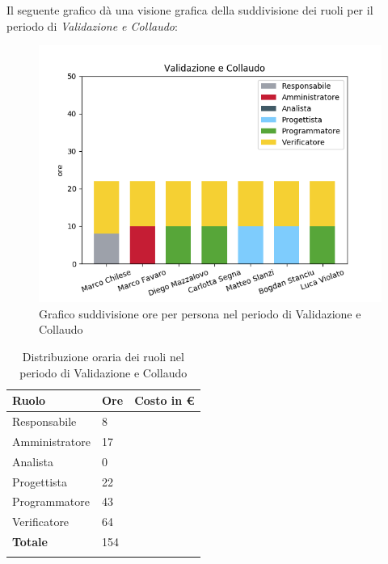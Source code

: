 Il seguente grafico dà una visione grafica della suddivisione dei ruoli per il periodo di \textit{Validazione e Collaudo}:

\begin{figure}[H]
	\centering
	\includegraphics[width=1\linewidth]{./images/fig_vc.png}
	\caption{Grafico suddivisione ore per persona nel periodo di Validazione e Collaudo}
	\label{fig:grafico suddivione ruoli periodo vc}
\end{figure}

\begin{longtable}{| C{.30\textwidth}| C{.15\textwidth}| C{.20\textwidth}|}
	\hline
	\textbf{Ruolo} & \textbf{Ore} & \textbf{Costo in \euro} \\
	\hline 
	Responsabile & 8 &  \\
	\hline
	Amministratore & 17 & \\
	\hline
	Analista & 0 &  \\
	\hline
	Progettista & 22 &  \\
	\hline
	Programmatore & 43 &  \\
	\hline
	Verificatore & 64 &  \\
	\hline
	\textbf{Totale} & 154 & \\ 
	\hline
	
	\caption{Distribuzione oraria dei ruoli nel periodo di Validazione e Collaudo}
	\label{Distribuzione oraria del periodo di Validazione e collaudo}
\end{longtable}

